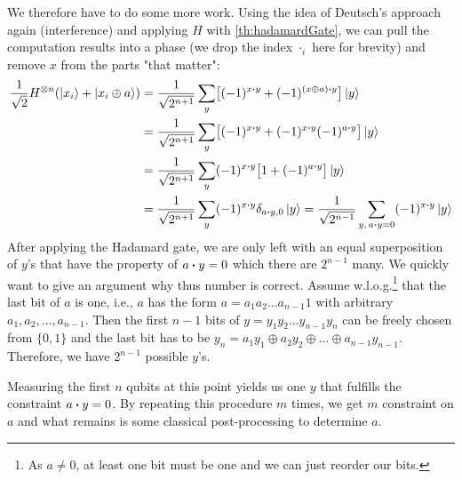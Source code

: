 				We therefore have to do some more work. Using the idea of Deutsch's approach again (interference) and applying \(H\) with \autoref{th:hadamardGate}, we can pull the computation results into a phase (we drop the index \(\cdot_i\) here for brevity) and remove \(x\) from the parts "that matter":
				\begin{align}
					\frac{1}{\sqrt{2}} H^{\otimes n} (\ket{x_i} + \ket{x_i \oplus a})
						&= \frac{1}{\sqrt{2^{n + 1}}} \sum_y \bigl[ (-1)^{x \dotproduct y} + (-1)^{(x \oplus a) \dotproduct y} \bigr] \ket{y} \\
						&= \frac{1}{\sqrt{2^{n + 1}}} \sum_y \bigl[ (-1)^{x \dotproduct y} + (-1)^{x \dotproduct y} (-1)^{a \dotproduct y} \bigr] \ket{y} \\
						&= \frac{1}{\sqrt{2^{n + 1}}} \sum_y (-1)^{x \dotproduct y} \bigl[ 1 + (-1)^{a \dotproduct y} \bigr] \ket{y} \\
						&= \frac{1}{\sqrt{2^{n + 1}}} \sum_y (-1)^{x \dotproduct y} \delta_{a \dotproduct y, 0} \ket{y}
						 = \frac{1}{\sqrt{2^{n - 1}}} \sum_{y,\, a \dotproduct y = 0} (-1)^{x \dotproduct y} \ket{y}
				\end{align}
				After applying the Hadamard gate, we are only left with an equal superposition of \(y\)'s that have the property of \( a \dotproduct y = 0 \) which there are \(2^{n - 1}\) many. We quickly want to give an argument why thus number is correct. Assume w.l.o.g.\footnote{As \(a \neq 0\), at least one bit must be one and we can just reorder our bits.} that the last bit of \(a\) is one, i.e., \(a\) has the form \( a = a_1 a_2 \dots a_{n - 1} 1 \) with arbitrary \( a_1, a_2, \dots, a_{n - 1} \). Then the first \(n - 1\) bits of \( y = y_1 y_2 \dots y_{n - 1} y_n \) can be freely chosen from \( \{ 0, 1 \} \) and the last bit has to be \( y_n = a_1 y_1 \oplus a_2 y_2 \oplus \dots \oplus a_{n - 1} y_{n - 1} \). Therefore, we have \(2^{n - 1}\) possible \(y\)'s.

				Measuring the first \(n\) qubits at this point yields us one \(y\) that fulfills the constraint \( a \dotproduct y = 0 \). By repeating this procedure \(m\) times, we get \(m\) constraint on \(a\) and what remains is some classical post-processing to determine \(a\).

